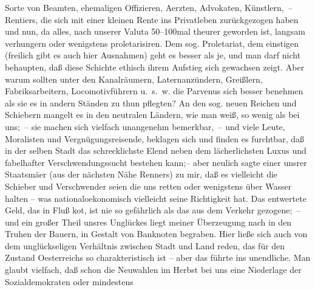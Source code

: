 \begin{ledgroupsized}[t]{13cm}
                    Sorte von Beamten, ehemaligen Offizieren, Aerzten, Advokaten, Künstlern, –
                    Rentiers, die sich mit einer kleinen Rente ins Privatleben zurückgezogen haben
                    und nun, da alles, nach unserer Valuta 50–100mal theurer geworden ist, langsam
                    verhungern oder wenigstens proletarisiren. Dem sog. Proletariat, dem einstigen
                    (freilich gibt es auch hier Ausnahmen) geht es besser als je, und man darf nicht
                    behaupten, daß diese Schichte ethisch ihrem Aufstieg sich gewachsen zeigt. Aber
                        \introOben{}warum\introOben{} sollten unter den Kanalräumern,
                    Laternanzündern, Greißlern, Fabriksarbeitern, Locomotivführern u. s. w. die
                    Parvenus sich besser benehmen als sie es in andern Ständen zu thun pflegten? {\pb}An den sog. neuen Reichen und Schiebern
                    mangelt es in den neutralen Ländern, wie man weiß, so wenig als bei uns; – sie
                    machen sich vielfach unangenehm bemerkbar, – und viele Leute, Moralisten und
                    Vergnügungsreisende, beklagen sich und finden es furchtbar, daß in der selben
                    Stadt das schrecklichste Elend neben dem lächerlichsten Luxus und fabelhafter
                    Verschwendungssucht bestehen kann;– aber neulich sagte einer unsrer Staatsmä{\geminationn}er (aus der nächsten Nähe Renners) zu mir, daß es vielleicht die
                    Schieber und Verschwender seien die uns retten oder wenigstens über Wasser
                    halten – was nationaloekonomisch vielleicht seine Richtigkeit hat. Das
                    entwertete Geld, das in Fluß ko{\geminationm}t, ist nie so
                    gefährlich als das aus dem Verkehr gezogene; – und ein großer Theil unsres
                    Unglückes liegt meiner Überzeugung nach in den Truhen der Bauern, in Gestalt von
                    Banknoten begraben. Hier ließe sich auch von dem unglückseligen Verhältnis
                    zwischen Stadt {\pb}und Land reden, das für den
                    Zustand Oesterreichs so charakteristisch ist
                    – aber das führte ins unendliche. Man glaubt vielfach, daß schon die Neuwahlen
                    im Herbst bei uns eine Niederlage der Sozialdemokraten oder mindestens

\end{ledgroupsized}
